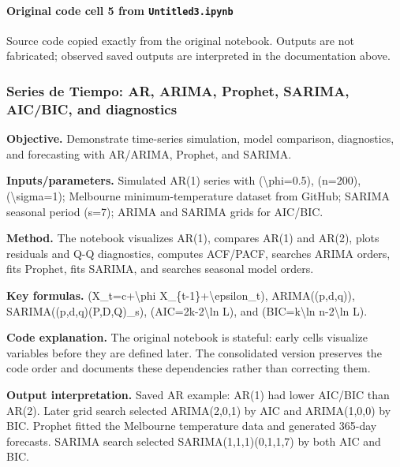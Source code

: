 \documentclass[
  11pt,
]{article}
\newenvironment{Shaded}{}{}
\begin{document}
\paragraph{\texorpdfstring{Original code cell 5 from \texttt{Untitled3.ipynb}}{Original code cell 5 from Untitled3.ipynb}}\label{original-code-cell-5-from-untitled3ipynb}

Source code copied exactly from the original notebook. Outputs are not fabricated; observed saved outputs are interpreted in the documentation above.

\begin{Shaded}
\begin{Highlighting}[]

\end{Highlighting}
\end{Shaded}

\subsubsection{Series de Tiempo: AR, ARIMA, Prophet, SARIMA, AIC/BIC, and diagnostics}\label{series-de-tiempo-ar-arima-prophet-sarima-aicbic-and-diagnostics}

\textbf{Objective.} Demonstrate time-series simulation, model comparison, diagnostics, and forecasting with AR/ARIMA, Prophet, and SARIMA.

\textbf{Inputs/parameters.} Simulated AR(1) series with (\textbackslash phi=0.5), (n=200), (\textbackslash sigma=1); Melbourne minimum-temperature dataset from GitHub; SARIMA seasonal period (s=7); ARIMA and SARIMA grids for AIC/BIC.

\textbf{Method.} The notebook visualizes AR(1), compares AR(1) and AR(2), plots residuals and Q-Q diagnostics, computes ACF/PACF, searches ARIMA orders, fits Prophet, fits SARIMA, and searches seasonal model orders.

\textbf{Key formulas.} (X\_t=c+\textbackslash phi X\_\{t-1\}+\textbackslash epsilon\_t), ARIMA((p,d,q)), SARIMA((p,d,q)(P,D,Q)\_s), (AIC=2k-2\textbackslash ln L), and (BIC=k\textbackslash ln n-2\textbackslash ln L).

\textbf{Code explanation.} The original notebook is stateful: early cells visualize variables before they are defined later. The consolidated version preserves the code order and documents these dependencies rather than correcting them.

\textbf{Output interpretation.} Saved AR example: AR(1) had lower AIC/BIC than AR(2). Later grid search selected ARIMA(2,0,1) by AIC and ARIMA(1,0,0) by BIC. Prophet fitted the Melbourne temperature data and generated 365-day forecasts. SARIMA search selected SARIMA(1,1,1)(0,1,1,7) by both AIC and BIC.
\end{document}
